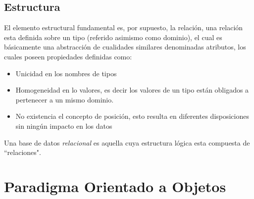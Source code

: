 \subsection {Estructura}
\noindent El elemento estructural fundamental es, por supuesto, la relación, una relación esta definida sobre un tipo
\noindent (referido asimismo como dominio), el cual es básicamente una abstracción de cualidades similares denominadas atributos,
\noindent los cuales poseen propiedades definidas como:
\begin{itemize}
    \item Unicidad en los nombres de tipos
    \item Homogeneidad en lo valores, es decir los valores de un tipo están obligados a pertenecer a un mismo dominio.
    \item No existencia el concepto de posición, esto resulta en diferentes disposiciones sin ningún impacto en los datos
\end{itemize}
\noindent Una base de datos \textit {relacional} es aquella cuya estructura lógica esta
\noindent compuesta de ``relaciones".
\section {Paradigma Orientado a Objetos}
